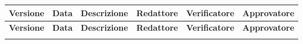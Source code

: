 \documentclass[a4paper,12pt]{article}
\begin{document}
\renewcommand{\arraystretch}{1.35}
{\footnotesize
    \setlength{\LTleft}{\fill}
    \setlength{\LTright}{\fill}
    \begin{longtable}{|p{1.1cm}|p{2.0cm}|p{4.3cm}|p{2.8cm}|p{2.0cm}|p{2.0cm}|}
        \hline
        \rowcolor{gray!20}
        \textbf{Versione} & \textbf{Data} & \textbf{Descrizione} & \textbf{Redattore} & \textbf{Verificatore} & \textbf{Approvatore} \\
        \hline
        \endfirsthead
        \hline
        \rowcolor{gray!20}
        \textbf{Versione} & \textbf{Data} & \textbf{Descrizione} & \textbf{Redattore} & \textbf{Verificatore} & \textbf{Approvatore} \\
        \hline
        \endhead
        \hline
        \endfoot
        \hline
        \endlastfoot
        

\end{longtable}}
\end{document}
